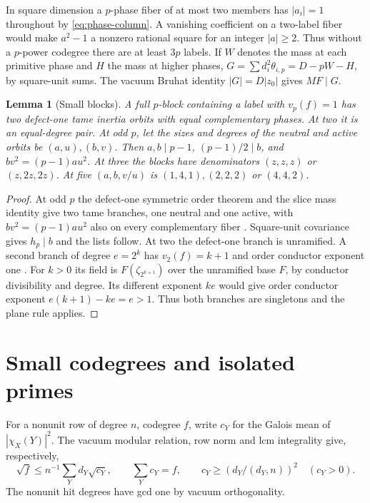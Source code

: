 \documentclass[11pt]{amsart}
\numberwithin{equation}{section}
\newtheorem{lemma}[theorem]{Lemma}
\theoremstyle{definition}
\theoremstyle{plain}
\begin{document}
In square dimension a $p$-phase fiber of at most two
members has $|a_i|=1$ throughout by \eqref{eq:phase-column}.
A vanishing coefficient on a two-label fiber would make $a^2-1$
a nonzero rational square for an integer $|a|\ge2$. Thus without
a $p$-power codegree there are at least $3p$ labels. If $W$ denotes
the mass at each primitive phase and $H$ the mass at higher phases,
$G=\sum d_i^2\theta_{i,p}=D-pW-H$, by square-unit sums.
The vacuum Bruhat identity $|G|=D|z_0|$ gives $MF\mid G$.

\begin{lemma}[Small blocks]\label{block:defectone}
A full $p$-block containing a label with $v_p(f)=1$ has two
defect-one tame inertia orbits with equal complementary phases.
At two it is an equal-degree pair. At odd $p$, let the sizes
and degrees of the neutral and active orbits be $(a,u),(b,v)$.
Then $a,b\mid p-1$, $(p-1)/2\mid b$, and $bv^2=(p-1)au^2$.
At three the blocks have denominators $(z,z,z)$ or $(z,2z,2z)$.
At five $(a,b,v/u)$ is $(1,4,1),(2,2,2)$ or $(4,4,2)$.
\end{lemma}
\begin{proof}
At odd $p$ the defect-one symmetric order theorem and the slice
mass identity give two tame branches, one neutral and one active,
with $bv^2=(p-1)au^2$ also on every complementary fiber
\cite[Proposition~2.13, Corollary~3.10, Proposition~19.11]{BDPcore}.
Square-unit covariance gives $h_p\mid b$ and the lists follow.
At two the defect-one branch is unramified. A second branch of
degree $e=2^k$ has $v_2(f)=k+1$ and order conductor exponent one
\cite[Lemma~2.12]{BDPcore}. For $k>0$ its field is
$F(\zeta_{2^{k+1}})$ over the unramified base $F$, by conductor
divisibility and degree. Its different exponent $ke$ would give
order conductor exponent $e(k+1)-ke=e>1$. Thus both branches are
singletons and the plane rule applies.
\end{proof}

\section{Small codegrees and isolated primes}
For a nonunit row of degree $n$, codegree $f$, write $c_Y$ for
the Galois mean of $|\chi_X(Y)|^2$. The vacuum modular relation,
row norm and lcm integrality give, respectively,
\begin{equation}\label{st}
 \sqrt f\le n^{-1}\sum_Yd_Y\sqrt{c_Y},\qquad
 \sum_Y c_Y=f,\qquad c_Y\ge(d_Y/(d_Y,n))^2\quad(c_Y>0).
\end{equation}
The nonunit hit degrees have gcd one by vacuum orthogonality.
\end{document}
